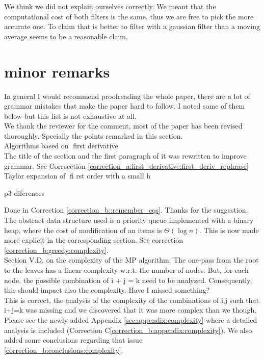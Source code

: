 \documentclass[a4paper,10pt]{report}
\begin{document}
\ans We think we did not explain ourselves correctly. We meant that the computational cost of both filters is the same, thus we are free to pick the more accurate one. To claim that is better to filter with a gaussian filter than a moving average seems to be a reasonable claim.\\

\section{minor remarks}

\que In general I would recommend proofreading the whole paper, there are a lot of grammar
mistakes that make the paper hard to follow, I noted some of them below but this list is not exhaustive at all.\\

\ans We thank the reviewer for the comment, most of the paper has been revised thoroughly. Specially the points remarked in this section.\\

\que Algorithms based on first derivative \\
\ans The title of the section and the first paragraph of it was rewritten to improve grammar. See Correcction \ref{correction_a:first_derivative:first_deriv_rephrase}\\

\que Taylor expansion of fi	rst order with a small h

\que p3 diferences

\ans Done in Correction \ref{correction_b::remember_eqs}. Thanks for the suggestion.\\

\ans The abstract data structure used is a priority queue implemented with a binary heap, where the cost of modification of an items is $\Theta(\log n)$.
This is now made more explicit in the corresponding section. See correction \ref{correction_b:greedy:complexity}.\\

\que Section V.D, on the complexity of the MP algorithm. The one-pass 
from the root to the leaves has a linear complexity w.r.t. the number 
of nodes. But, for each node, the possible combination of i + j = k 
need to be analyzed. Consequently, this should impact also the 
complexity. Have I missed something? \\

\ans This is correct, the analysis of the complexity of the combinations of i,j such that i+j=k was missing and we discovered that it was more complex than we though. Please see the newly added Appendix \ref{sec:appendix:complexity} where a detailed analysis is included (Correction C\ref{correction_b:appendix:complexity}). We also added some conclusions regarding that issue \ref{correction_b:conclusions:complexity}.\\
\end{document}
